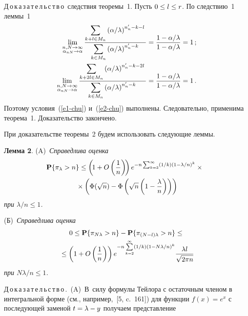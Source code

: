 \begin{multicols}{2}
\medskip

\noindent
Д\,о\,к\,а\,з\,а\,т\,е\,л\,ь\,с\,т\,в\,о\ следствия теоремы~1. Пусть $0\hm\le l\hm\le r$. По
следствию~1 леммы~1
\begin{align*}
\lim_{\substack{{n, N\to\infty}\\ {\alpha_{nN}\to\alpha}}}\displaystyle\frac{\displaystyle \sum\limits_{k+l\in
M_n}\left({\alpha}/{\lambda}\right)^{n'_n-k-l}\mathstrut}{\displaystyle \sum\limits_{k\in
M_n}\left({\alpha}/{\lambda}\right)^{n'_n-k}\mathstrut}&=
\displaystyle\frac{\displaystyle 1-{\alpha}/{\lambda}\mathstrut}{\displaystyle 1-{\alpha}/{\lambda}\mathstrut}=1\,;
\\
\lim_{\substack{{n, N\to\infty}\\ {\alpha_{nN}\to\alpha}}}\displaystyle\frac{\displaystyle \sum\limits_{k+2l\in
M_n}\left({\alpha}/{\lambda}\right)^{n'_n-k-2l}\mathstrut}{\displaystyle \sum\limits_{k\in
M_n}\left({\alpha}/{\lambda}\right)^{n'_n-k}\mathstrut}&=\displaystyle\frac{\displaystyle 1-{\alpha}/{\lambda}\mathstrut}{\displaystyle 1-{\alpha}/{\lambda}\mathstrut}=1\,.
\end{align*}
Поэтому условия~(\ref{e1-chu}) и~(\ref{e2-chu}) выполнены. Следовательно, применима
теорема~1. Доказательство закончено.

\medskip

При доказательстве теоремы~2 будем использовать следующие леммы.

\medskip

\noindent
\textbf{Лемма 2}. (A)~\textit{Справедлива оценка
\begin{multline}
\!\!\!\mathbf{P}\{\pi_{\lambda}>n\}\le\left(\!1+O\left(\displaystyle\frac{\displaystyle 1\mathstrut}{\displaystyle n\mathstrut}\right)\!\right)e^{-n\sum_{k=3}^{\infty}
({1}/{k})\left(1-{\lambda}/{n}\right)^k}\times{}\\
{}\times
\left(\Phi(\sqrt{n})-\Phi\left(\sqrt{n}\left(1-\displaystyle\frac{\displaystyle \lambda\mathstrut}{\displaystyle n\mathstrut}\right)\right)\right)
\label{e10-chu}
\end{multline}
при   ${\lambda}/{n}\le 1$.}

\smallskip

(Б)~\textit{Справедлива оценка
\begin{multline}
0\le \mathbf{P}\{\pi_{N\lambda}>n\}-\mathbf{P}\{\pi_{(N-l)\lambda}>n\}\le{}\\
{}\le
\left(1+O\left(
\displaystyle\frac{\displaystyle 1\mathstrut}{\displaystyle n\mathstrut}\right)\right)e^{-n\sum\limits_{k=2}^{\infty}(1/k)\left(1-{N\lambda}/{n}\right)^k}
\displaystyle\frac{\displaystyle \lambda l\mathstrut}{\displaystyle \sqrt{2\pi n}\mathstrut} 
\label{e11-chu}
\end{multline}
при   ${N\lambda}/{n}\le 1$.}

\medskip

\noindent
Д\,о\,к\,а\,з\,а\,т\,е\,л\,ь\,с\,т\,в\,о\,.\ (A)~В~силу формулы Тейлора с остаточным
членом в интегральной форме (см., например,~[5, c.~161]) для функции
$f(x)=e^x$ с последующей заменой  $t\hm=\lambda-y$  получаем
пред\-став\-ле\-ние


\end{multicols}
